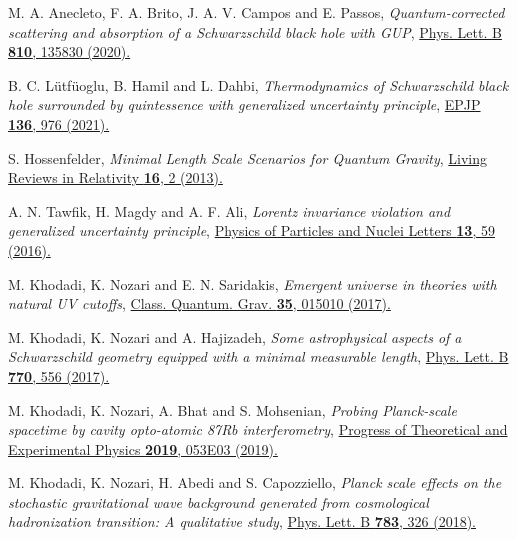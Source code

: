 \documentclass[aps,amsmath,amssymb,showpacs,showkeys]{revtex4}
\begin{document}
\begin{thebibliography}{99}
M. A. Anecleto, F. A. Brito, J. A. V. Campos and E. Passos, \textit{Quantum-corrected scattering and absorption of a Schwarzschild black hole with GUP}, \href{https://www.sciencedirect.com/science/article/pii/S037026932030633X?via%3Dihub}{Phys. Lett. B \textbf{810}, 135830 (2020).}

B. C. L\"utf\"uoglu, B. Hamil and L. Dahbi, \textit{Thermodynamics of Schwarzschild black hole surrounded by quintessence with generalized uncertainty principle}, \href{https://link.springer.com/article/10.1140/epjp/s13360-021-01975-y}{EPJP \textbf{136}, 976 (2021).}





S. Hossenfelder, \textit{Minimal Length Scale Scenarios for Quantum Gravity}, \href{https://link.springer.com/article/10.12942/lrr-2013-2}{Living Reviews in Relativity \textbf{16}, 2 (2013).}

A. N. Tawfik, H. Magdy and A. F. Ali, \textit{Lorentz invariance violation and generalized uncertainty principle}, \href{https://link.springer.com/article/10.1134/S1547477116010179}{Physics of Particles and Nuclei Letters \textbf{13}, 59 (2016).}

M. Khodadi, K. Nozari and E. N. Saridakis, \textit{Emergent universe in theories with natural UV cutoffs}, \href{https://iopscience.iop.org/article/10.1088/1361-6382/aa95aa}{Class. Quantum. Grav. \textbf{35}, 015010 (2017).}

M. Khodadi, K. Nozari and A. Hajizadeh, \textit{Some astrophysical aspects of a Schwarzschild geometry equipped with a minimal measurable length}, \href{https://www.sciencedirect.com/science/article/pii/S0370269317303738?via%3Dihub}{Phys. Lett. B \textbf{770}, 556 (2017).}

M. Khodadi, K. Nozari, A. Bhat and S. Mohsenian, \textit{Probing Planck-scale spacetime by cavity opto-atomic 87Rb interferometry}, \href{https://doi.org/10.1093/ptep/ptz039}{Progress of Theoretical and Experimental Physics \textbf{2019}, 053E03 (2019).}

M. Khodadi, K. Nozari, H. Abedi and S. Capozziello, \textit{Planck scale effects on the stochastic gravitational wave background generated from cosmological hadronization transition: A qualitative study}, \href{https://www.sciencedirect.com/science/article/pii/S0370269318305483?via%3Dihub}{Phys. Lett. B \textbf{783}, 326 (2018).}


\end{thebibliography}
\end{document}
